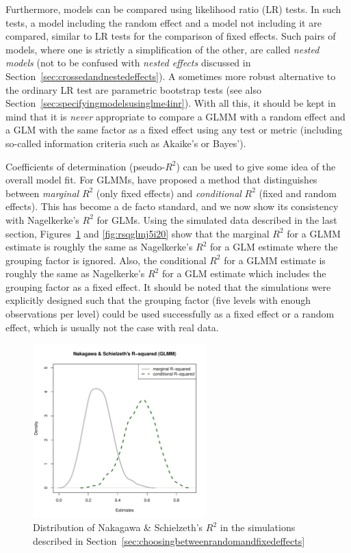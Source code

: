 Furthermore, models can be compared using likelihood ratio (LR) tests.
In such tests, a model including the random effect and a model not including it are compared, similar to LR tests for the comparison of fixed effects.
Such pairs of models, where one is strictly a simplification of the other, are called \textit{nested models} (not to be confused with \textit{nested effects} discussed in Section~\ref{sec:crossedandnestedeffects}).
A sometimes more robust alternative to the ordinary LR test are parametric bootstrap tests (see also Section~\ref{sec:specifyingmodelsusinglme4inr}).
With all this, it should be kept in mind that it is \textit{never} appropriate to compare a GLMM with a random effect and a GLM with the same factor as a fixed effect using any test or metric (including so-called information criteria such as Akaike's or Bayes').

Coefficients of determination (pseudo-$R^2$) can be used to give some idea of the overall model fit.
For GLMMs, \citet{NakagawaSchielzeth2013} have proposed a method that distinguishes between \textit{marginal} $R^2$ (only fixed effects) and \textit{conditional} $R^2$ (fixed and random effects).
This has become a de facto standard, and we now show its consistency with Nagelkerke's $R^2$ for GLMs.
Using the simulated data described in the last section, Figures~\ref{fig:rsqglmmj5i20} and \ref{fig:rsqglmj5i20} show that the marginal $R^2$ for a GLMM estimate is roughly the same as Nagelkerke's $R^2$ for a GLM estimate where the grouping factor is ignored.
Also, the conditional $R^2$ for a GLMM estimate is roughly the same as Nagelkerke's $R^2$ for a GLM estimate which includes the grouping factor as a fixed effect.
It should be noted that the simulations were explicitly designed such that the grouping factor (five levels with enough observations per level) could be used successfully as a fixed effect or a random effect, which is usually not the case with real data.

\begin{figure}[!htpb]
  \centering
  \includegraphics[width=0.6\textwidth]{graphics/rsqglmmj5i20}
  \caption{Distribution of Nakagawa \& Schielzeth's $R^2$ in the simulations described in Section~\ref{sec:choosingbetweenrandomandfixedeffects}}
  \label{fig:rsqglmmj5i20}
\end{figure}

